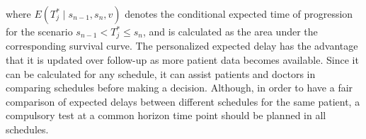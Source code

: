 where $E(T^*_j \mid s_{n-1}, s_n, v)$ denotes the conditional expected time of progression for the scenario $s_{n-1} < T^*_j \leq s_n$, and is calculated as the area under the corresponding survival curve. The personalized expected delay has the advantage that it is updated over follow-up as more patient data becomes available. Since it can be calculated for any schedule, it can assist patients and doctors in comparing schedules before making a decision. Although, in order to have a fair comparison of expected delays between different schedules for the same patient, a compulsory test at a common horizon time point should be planned in all schedules.